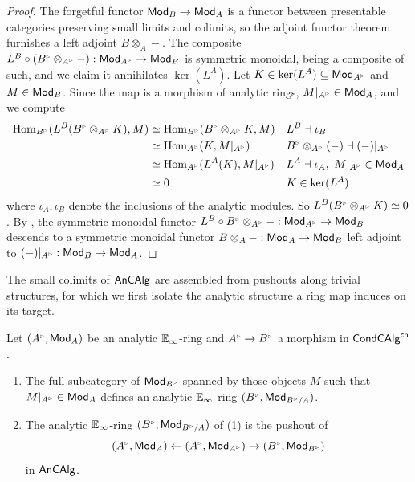 \begin{proof}
    The forgetful functor $\mathsf{Mod}_{B}\to\mathsf{Mod}_{A}$ is a functor between presentable categories preserving small limits and colimits, so the adjoint functor theorem \cite[Cor. 5.5.2.9]{HTT} furnishes a left adjoint $B\otimes_{A}-$. The composite $L^{B}\circ(B^{\tri}\otimes_{A^{\tri}}-):\Mod_{A^{\tri}}\to\Mod_{B}$ is symmetric monoidal, being a composite of such, and we claim it annihilates $\ker(L^{A})$. Let $K\in\ker(L^{A})\subseteq\Mod_{A^{\tri}}$ and $M\in\mathsf{Mod}_{B}$. Since the map is a morphism of analytic rings, $M|_{A^{\tri}}\in\Mod_{A}$, and we compute
    \begin{align*}
        \Hom_{B^{\tri}}(L^{B}(B^{\tri}\otimes_{A^{\tri}}K),M) &\simeq \Hom_{B^{\tri}}(B^{\tri}\otimes_{A^{\tri}}K,M) && L^{B}\dashv\iota_{B}\\
        &\simeq \Hom_{A^{\tri}}(K,M|_{A^{\tri}}) && B^{\tri}\otimes_{A^{\tri}}(-)\dashv(-)|_{A^{\tri}}\\
        &\simeq \Hom_{A^{\tri}}(L^{A}(K),M|_{A^{\tri}}) && L^{A}\dashv\iota_{A},\ M|_{A^{\tri}}\in\Mod_{A}\\
        &\simeq 0 && K\in\ker(L^{A})
    \end{align*}
    where $\iota_{A},\iota_{B}$ denote the inclusions of the analytic modules. So $L^{B}(B^{\tri}\otimes_{A^{\tri}}K)\simeq0$. By \cite[Thm. I.3.6 \& App. S]{TC}, the symmetric monoidal functor $L^{B}\circ B^{\tri}\otimes_{A^{\tri}}-:\Mod_{A^{\tri}}\to\Mod_{B}$ descends to a symmetric monoidal functor $B\otimes_{A}-:\mathsf{Mod}_{A}\to\mathsf{Mod}_{B}$ left adjoint to $(-)|_{A^{\tri}}:\Mod_{B}\to\Mod_{A}$.
\end{proof}
The small colimits of $\mathsf{An}\mathsf{CAlg}$ are assembled from pushouts along trivial structures, for which we first isolate the analytic structure a ring map induces on its target.
\begin{proposition}\label{prop: induced analytic ring structure}
    Let $(A^{\tri},\Mod_{A})$ be an analytic $\mathbb{E}_{\infty}$-ring and $A^{\tri}\to B^{\tri}$ a morphism in $\mathsf{Cond}\mathsf{CAlg}^{\mathsf{cn}}$. 
    \begin{enumerate}
        \item The full subcategory of $\Mod_{B^{\tri}}$ spanned by those objects $M$ such that $M|_{A^{\tri}}\in\Mod_{A}$ defines an analytic $\mathbb{E}_{\infty}$-ring $(B^{\tri},\Mod_{B^{\tri}/A})$. 
        \item The analytic $\mathbb{E}_{\infty}$-ring $(B^{\tri},\Mod_{B^{\tri}/A})$ of (1) is the pushout of 
        $$(A^{\tri},\Mod_{A})\leftarrow(A^{\tri},\Mod_{A^{\tri}})\to(B^{\tri},\Mod_{B^{\tri}})$$
        in $\mathsf{An}\mathsf{CAlg}$. 
    \end{enumerate}
\end{proposition}
